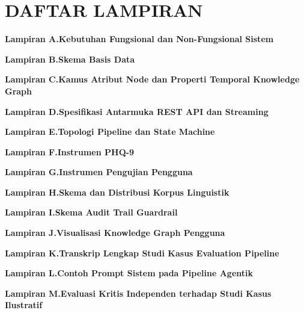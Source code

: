 \chapter*{DAFTAR LAMPIRAN}

\begingroup
\setlength{\parskip}{0.5em}
\noindent\textbf{Lampiran A.\hspace{0.4em}Kebutuhan Fungsional dan Non-Fungsional Sistem} \dotfill \pageref{lamp:fr}\par
\noindent\textbf{Lampiran B.\hspace{0.4em}Skema Basis Data} \dotfill \pageref{lamp:db}\par
\noindent\textbf{Lampiran C.\hspace{0.4em}Kamus Atribut Node dan Properti Temporal Knowledge Graph} \dotfill \pageref{lamp:kg}\par
\noindent\textbf{Lampiran D.\hspace{0.4em}Spesifikasi Antarmuka REST API dan Streaming} \dotfill \pageref{lamp:api}\par
\noindent\textbf{Lampiran E.\hspace{0.4em}Topologi Pipeline dan State Machine} \dotfill \pageref{lamp:pipeline}\par
\noindent\textbf{Lampiran F.\hspace{0.4em}Instrumen PHQ-9} \dotfill \pageref{lamp:phq9}\par
\noindent\textbf{Lampiran G.\hspace{0.4em}Instrumen Pengujian Pengguna} \dotfill \pageref{lamp:userstudy}\par
\noindent\textbf{Lampiran H.\hspace{0.4em}Skema dan Distribusi Korpus Linguistik} \dotfill \pageref{lamp:korpus}\par
\noindent\textbf{Lampiran I.\hspace{0.4em}Skema Audit Trail Guardrail} \dotfill \pageref{lamp:audit}\par
\noindent\textbf{Lampiran J.\hspace{0.4em}Visualisasi Knowledge Graph Pengguna} \dotfill \pageref{lamp:kg-visual}\par
\noindent\textbf{Lampiran K.\hspace{0.4em}Transkrip Lengkap Studi Kasus Evaluation Pipeline} \dotfill \pageref{lamp:eval-transcripts}\par
\noindent\textbf{Lampiran L.\hspace{0.4em}Contoh Prompt Sistem pada Pipeline Agentik} \dotfill \pageref{lamp:agentic-prompts}\par
\noindent\textbf{Lampiran M.\hspace{0.4em}Evaluasi Kritis Independen terhadap Studi Kasus Ilustratif} \dotfill \pageref{lamp:eval-critical}\par
\endgroup
